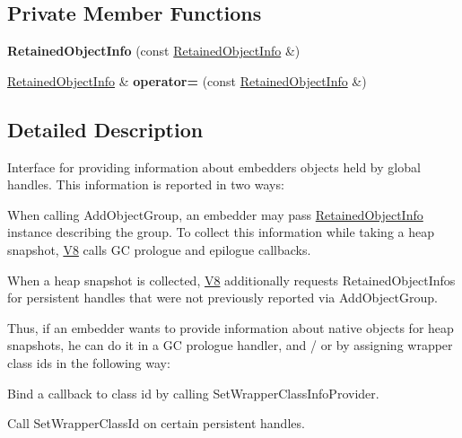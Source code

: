 \subsection*{Private Member Functions}
\begin{DoxyCompactItemize}
\item 
{\bfseries Retained\+Object\+Info} (const \hyperlink{classv8_1_1_retained_object_info}{Retained\+Object\+Info} \&)\hypertarget{classv8_1_1_retained_object_info_af2d2af908d53a2e4e2f543b7c67057c8}{}\label{classv8_1_1_retained_object_info_af2d2af908d53a2e4e2f543b7c67057c8}

\item 
\hyperlink{classv8_1_1_retained_object_info}{Retained\+Object\+Info} \& {\bfseries operator=} (const \hyperlink{classv8_1_1_retained_object_info}{Retained\+Object\+Info} \&)\hypertarget{classv8_1_1_retained_object_info_a11fcc91279bee920e05e217c77f78eed}{}\label{classv8_1_1_retained_object_info_a11fcc91279bee920e05e217c77f78eed}

\end{DoxyCompactItemize}


\subsection{Detailed Description}
Interface for providing information about embedder\textquotesingle{}s objects held by global handles. This information is reported in two ways\+:


\begin{DoxyEnumerate}
\item When calling Add\+Object\+Group, an embedder may pass \hyperlink{classv8_1_1_retained_object_info}{Retained\+Object\+Info} instance describing the group. To collect this information while taking a heap snapshot, \hyperlink{classv8_1_1_v8}{V8} calls GC prologue and epilogue callbacks.
\item When a heap snapshot is collected, \hyperlink{classv8_1_1_v8}{V8} additionally requests Retained\+Object\+Infos for persistent handles that were not previously reported via Add\+Object\+Group.
\end{DoxyEnumerate}

Thus, if an embedder wants to provide information about native objects for heap snapshots, he can do it in a GC prologue handler, and / or by assigning wrapper class ids in the following way\+:


\begin{DoxyEnumerate}
\item Bind a callback to class id by calling Set\+Wrapper\+Class\+Info\+Provider.
\item Call Set\+Wrapper\+Class\+Id on certain persistent handles.
\end{DoxyEnumerate}

